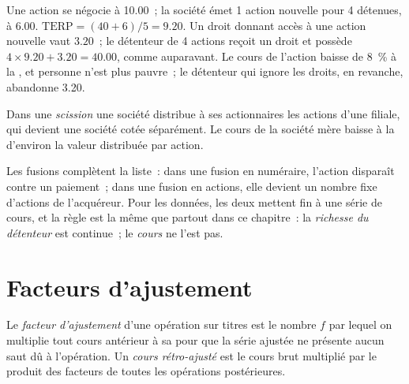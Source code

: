 \begin{example}\label{ex:m1:shares-corporate-actions-indices:terp}
Une action se négocie à 10.00~; la société émet 1 action nouvelle pour 4 détenues, à 6.00.
$\mathrm{TERP} = (40 + 6)/5 = 9.20$. Un droit donnant accès à une action nouvelle vaut
$3.20$~; le détenteur de 4 actions reçoit un droit et possède $4 \times 9.20 +
3.20 = 40.00$, comme auparavant. Le cours de l'action baisse de 8~\% à la ,
et personne n'est plus pauvre~; le détenteur qui ignore les droits, en revanche, abandonne 3.20.
\end{example}

\begin{definition}[Scission]\label{def:m1:shares-corporate-actions-indices:spinoff}
Dans une \emph{scission} une société distribue à ses
actionnaires les actions d'une filiale, qui devient une société
cotée séparément. Le cours de la société mère baisse à la 
d'environ la valeur distribuée par action.
\end{definition}

Les fusions complètent la liste~: dans une fusion en numéraire, l'action disparaît contre un
paiement~; dans une fusion en actions, elle devient un nombre fixe d'actions de l'acquéreur.
Pour les données, les deux mettent fin à une série de cours, et la règle est la même
que partout dans ce chapitre~: la \emph{richesse du détenteur} est continue~; le
\emph{cours} ne l'est pas.

\section{Facteurs d'ajustement}

\begin{definition}\label{def:m1:shares-corporate-actions-indices:factor}
Le \emph{facteur d'ajustement} d'une opération sur titres
est le nombre $f$ par lequel on multiplie tout cours antérieur à sa 
pour que la série ajustée ne présente aucun saut dû à l'opération. Un
\emph{cours rétro-ajusté} est le cours brut multiplié par le produit des facteurs
de toutes les opérations postérieures.
\end{definition}

